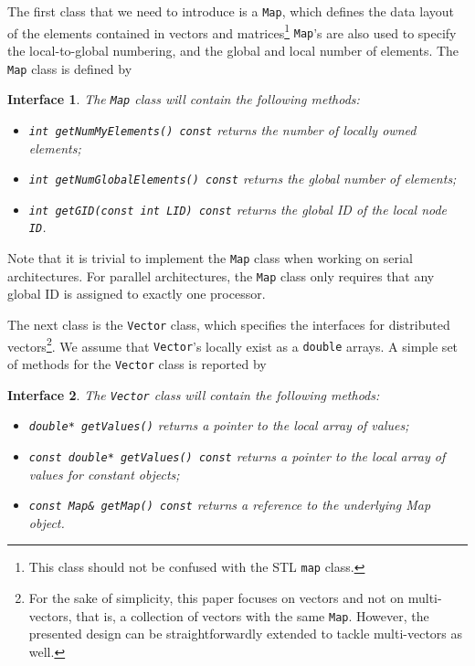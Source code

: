 \documentclass[acmtoms,acmnow]{acmtrans2m}
\newtheorem{interface}{Interface}[section]
\begin{document}
\smallskip

The first class that we need to introduce is a {\tt Map}, which defines the
data layout of the elements contained in vectors and matrices\footnote{This
class should not be confused with the STL {\tt map} class.} {\tt Map}'s
are also used to specify the local-to-global numbering, and the global and
local number of elements.  The {\tt Map} class is defined by
\begin{interface}
\label{int:map}
The {\tt Map} class will contain the following methods:

\begin{itemize}
\item {\tt int getNumMyElements() const} returns the number of locally owned elements;
\item {\tt int getNumGlobalElements() const} returns the global number of elements;
\item {\tt int getGID(const int LID) const} returns the global ID of the local node {\tt ID}.
\end{itemize}
\end{interface}

Note that it is trivial to implement the {\tt Map} class when working on
serial architectures. For parallel architectures, the {\tt Map} class
only requires that any global ID is assigned to exactly one processor.

The next class is the {\tt Vector}
class, which specifies the interfaces for
distributed vectors\footnote{
For the sake of simplicity, this paper focuses on vectors and not on
multi-vectors, that is, a collection of vectors with the same {\tt Map}.
However, the presented design can be straightforwardly extended to tackle
multi-vectors as well.
}. We assume that {\tt Vector}'s  locally exist as a {\tt double} arrays.
A simple set of methods for the {\tt Vector} class is reported by
\begin{interface}
\label{int:vector}
The {\tt Vector} class will contain the following methods:

\begin{itemize}
\item {\tt double* getValues()} returns a pointer to the local array of values;
\item {\tt const double* getValues() const} returns a pointer to the local
array of values for constant objects;
\item {\tt const Map\& getMap() const} returns a reference to the underlying Map object.
\end{itemize}
\end{interface}
\end{document}
